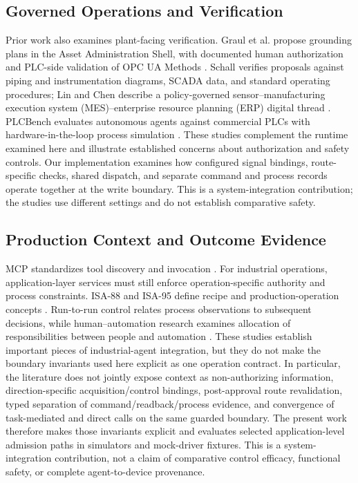 \documentclass[journal]{IEEEtran}
\begin{document}
\subsection{Governed Operations and Verification}
Prior work also examines plant-facing verification. Graul et al. propose grounding plans in the Asset Administration Shell, with documented human authorization and PLC-side validation of OPC UA Methods \cite{graul2026aas}. Schall verifies proposals against piping and instrumentation diagrams, SCADA data, and standard operating procedures; Lin and Chen describe a policy-governed sensor--manufacturing execution system (MES)--enterprise resource planning (ERP) digital thread \cite{schall2026safe,lin2026agentic}. PLCBench evaluates autonomous agents against commercial PLCs with hardware-in-the-loop process simulation \cite{zhou2026plcbench}. These studies complement the runtime examined here and illustrate established concerns about authorization and safety controls. Our implementation examines how configured signal bindings, route-specific checks, shared dispatch, and separate command and process records operate together at the write boundary. This is a system-integration contribution; the studies use different settings and do not establish comparative safety.

\subsection{Production Context and Outcome Evidence}
MCP standardizes tool discovery and invocation \cite{mcp2026}. For industrial operations, application-layer services must still enforce operation-specific authority and process constraints. ISA-88 and ISA-95 define recipe and production-operation concepts \cite{isa88_2010,isa95_2025}. Run-to-run control relates process observations to subsequent decisions, while human--automation research examines allocation of responsibilities between people and automation \cite{moyne2001r2r,parasuraman2000model}. These studies establish important pieces of industrial-agent integration, but they do not make the boundary invariants used here explicit as one operation contract. In particular, the literature does not jointly expose context as non-authorizing information, direction-specific acquisition/control bindings, post-approval route revalidation, typed separation of command/readback/process evidence, and convergence of task-mediated and direct calls on the same guarded boundary. The present work therefore makes those invariants explicit and evaluates selected application-level admission paths in simulators and mock-driver fixtures. This is a system-integration contribution, not a claim of comparative control efficacy, functional safety, or complete agent-to-device provenance.
\end{document}
